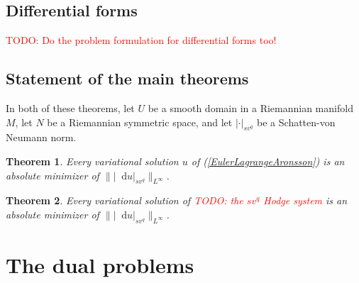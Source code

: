 \documentclass[reqno,11pt]{amsart}
\newcommand*\dif{\mathop{}\!\mathrm{d}}
\newtheorem{mainthm}{Theorem}
\theoremstyle{definition}
\numberwithin{equation}{section}
\newcommand\todo[1]{\textcolor{red}{TODO: #1}}
\begin{document}
\subsection{Differential forms}
\todo{Do the problem formulation for differential forms too!}


\subsection{Statement of the main theorems}
In both of these theorems, let $U$ be a smooth domain in a Riemannian manifold $M$, let $N$ be a Riemannian symmetric space, and let $|\cdot|_{sv^q}$ be a Schatten-von Neumann norm.

\begin{mainthm}
Every variational solution $u$ of (\ref{EulerLagrangeAronsson}) is an absolute minimizer of $\||\dif u|_{sv^q}\|_{L^\infty}$.
\end{mainthm}

\begin{mainthm}
Every variational solution of \todo{the $sv^q$ Hodge system} is an absolute minimizer of $\||\dif u|_{sv^q}\|_{L^\infty}$.
\end{mainthm}


\section{The dual problems}
\end{document}
